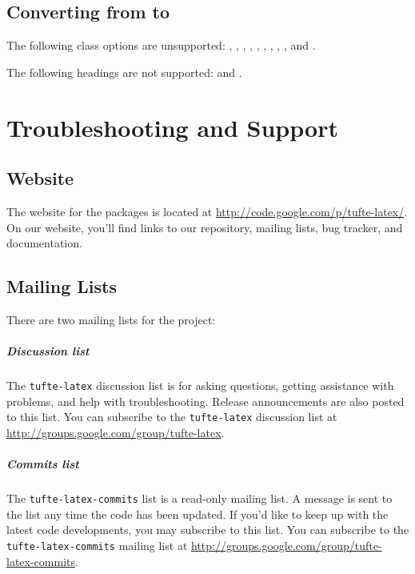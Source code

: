 \section{Converting from  to }

The following  class options are unsupported: \docclsopt{10pt}, \docclsopt{11pt}, \docclsopt{12pt}, , , , , , , and .

The following headings are not supported:  and .



\chapter{Troubleshooting and Support}
\label{ch:troubleshooting}

\section{\TL Website}\label{sec:website}
The website for the \TL packages is located at
\url{http://code.google.com/p/tufte-latex/}.  On our website, you'll find
links to our  repository, mailing lists, bug tracker, and documentation.

\section{\TL Mailing Lists}\label{sec:mailing-lists}
There are two mailing lists for the \TL project:

\paragraph{Discussion list}
The \texttt{tufte-latex} discussion list is for asking questions, getting
assistance with problems, and help with troubleshooting.  Release announcements
are also posted to this list.  You can subscribe to the \texttt{tufte-latex}
discussion list at \url{http://groups.google.com/group/tufte-latex}.

\paragraph{Commits list}
The \texttt{tufte-latex-commits} list is a read-only mailing list.  A message
is sent to the list any time the \TL code has been updated.  If you'd like to
keep up with the latest code developments, you may subscribe to this list.  You
can subscribe to the \texttt{tufte-latex-commits} mailing list at
\url{http://groups.google.com/group/tufte-latex-commits}.

